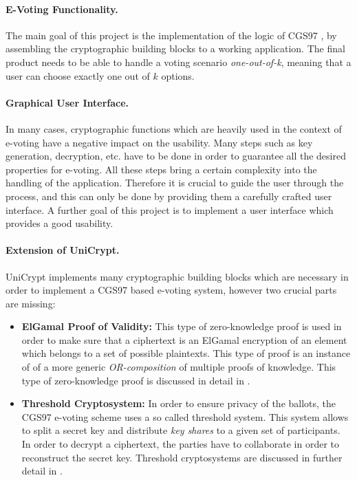 \documentclass[numbers=noenddot, abstract=on, a4paper, headsepline,
footsepline, oneside, draft=off]{scrreprt}
\begin{document}
\paragraph{E-Voting Functionality.}
The main goal of this project is the implementation of the logic of CGS97
\cite{CGS97}, by assembling the cryptographic building blocks to a working
application. The final product needs to be able to handle a
voting scenario \emph{one-out-of-k}, meaning that a user can choose exactly one
out of $k$ options. 

\paragraph{Graphical User Interface.}
In many cases, cryptographic functions which are heavily used in the context of
e-voting have a negative impact on the usability. Many steps such as key
generation, decryption, etc. have to be done in order to guarantee all the
desired properties for e-voting. All these steps bring a certain complexity
into the handling of the application. Therefore it is crucial to guide the user
through the process, and this can only be done by providing them a carefully
crafted user interface. A further goal of this project is to implement a user
interface which provides a good usability.

\paragraph{Extension of UniCrypt.}
UniCrypt implements many cryptographic building blocks which are necessary in
order to implement a CGS97 based e-voting system, however two crucial parts are
missing:
\begin{itemize}
  \item \textbf{ElGamal Proof of Validity:} This type of zero-knowledge proof is
  used in order to make sure that a ciphertext is an ElGamal encryption of an
  element which belongs to a set of possible plaintexts. This type of proof is
  an instance of of a more generic \emph{OR-composition} of multiple proofs of
  knowledge. This type of zero-knowledge proof is discussed in detail in
  .
  \item \textbf{Threshold Cryptosystem:} In order to ensure privacy of
  the ballots, the CGS97 e-voting scheme uses a so called threshold system. This
  system allows to split a secret key and distribute \emph{key shares} to a
  given set of participants. In order to decrypt a ciphertext, the parties have
  to collaborate in order to reconstruct the secret key. Threshold cryptosystems
  are discussed in further detail in .
\end{itemize}
\end{document}
